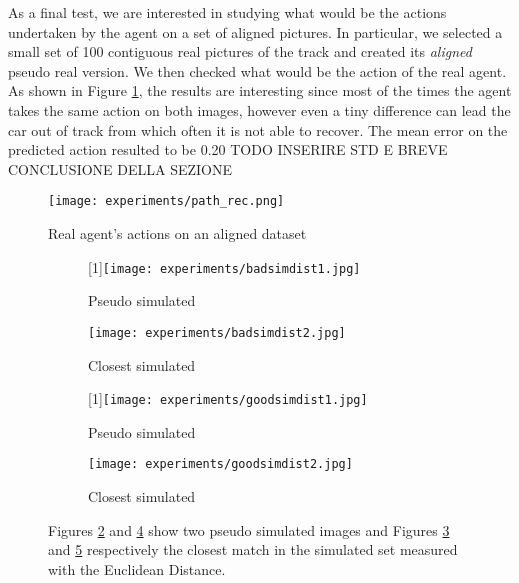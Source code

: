 As a final test, we are interested in studying what would be the actions undertaken by the agent on a set of aligned pictures. In particular, we selected a small set of 100 contiguous real pictures of the track and created its \textit{aligned} pseudo real version. We then checked what would be the action of the real agent. As shown in Figure \ref{fig:path_rec}, the results are interesting since most of the times the agent takes the same action on both images, however even a tiny difference can lead the car out of track from which often it is not able to recover. The mean error on the predicted action resulted to be 0.20 
TODO INSERIRE STD E BREVE CONCLUSIONE DELLA SEZIONE 

\begin{figure}[h]
  \begin{center}
    \texttt{[image: experiments/path\_rec.png]}
  \end{center}
  \caption{Real agent's actions on an aligned dataset}
  \label{fig:path_rec}
\end{figure}

\begin{figure}[h]
  \centering
  \begin{subfigure}{.24\linewidth}
      \centering
      \scalebox{-1}[1]{\texttt{[image: experiments/badsimdist1.jpg]}}
      \caption{Pseudo simulated}\label{fig:badsimdist1}
  \end{subfigure}%
  \hfill
  \begin{subfigure}{.24\linewidth}
    \centering
    \texttt{[image: experiments/badsimdist2.jpg]}
    \caption{Closest simulated}\label{fig:badsimdist2}
  \end{subfigure}%
  \hfill
  \begin{subfigure}{.24\linewidth}
      \centering
      \scalebox{-1}[1]{\texttt{[image: experiments/goodsimdist1.jpg]}}
      \caption{Pseudo simulated}\label{fig:goodsimdist1}
  \end{subfigure}%
  \hfill
  \begin{subfigure}{.24\linewidth}
    \centering
    \texttt{[image: experiments/goodsimdist2.jpg]}
    \caption{Closest simulated}\label{fig:goodsimdist2}
\end{subfigure}
  \caption{Figures \ref{fig:badsimdist1} and \ref{fig:goodsimdist1} show two pseudo simulated images and Figures \ref{fig:badsimdist2} and \ref{fig:goodsimdist2} respectively the closest match in the simulated set measured with the Euclidean Distance.}
  \label{fig:simdistance}
\end{figure}

